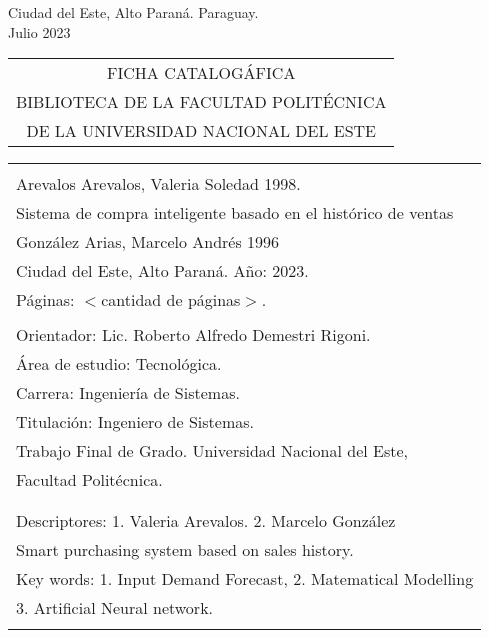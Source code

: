 \begin{center}
{\large Ciudad del Este, Alto Paraná. Paraguay.\\[6mm]
Julio 2023}
\end{center}
\newpage \normalsize
\thispagestyle{empty}
\begin{center} 
\begin{tabular}{c} 
  FICHA CATALOGÁFICA \\
  BIBLIOTECA DE LA FACULTAD POLITÉCNICA \\
  DE LA UNIVERSIDAD NACIONAL DEL ESTE \\
\end{tabular} %
\vspace{0.3cm}
\begin{tabular}{|l|} \hline %
  \\
  Arevalos Arevalos, Valeria Soledad 1998.\\
   Sistema de compra inteligente basado en el histórico de ventas  \\
  González Arias, Marcelo Andrés 1996\\
  Ciudad del Este, Alto Paraná. Año: 2023.\\
  Páginas: $<$cantidad de páginas$>$.\\ 
  \\
  Orientador: Lic. Roberto Alfredo Demestri Rigoni. \\
  
  Área de estudio: Tecnológica. \\
  Carrera: Ingeniería de Sistemas. \\
  Titulación: Ingeniero de Sistemas. \\
  
  Trabajo Final de Grado. Universidad Nacional del Este, \\
  Facultad Politécnica.\\
  \\ \\
  
  Descriptores: 1. Valeria Arevalos. 2. Marcelo González\\
  Smart purchasing system based on sales history. \\
  Key words: 1. Input Demand Forecast, 2. Matematical Modelling \\
  \hspace{2cm} 3. Artificial Neural network.\\
  \\
  \hline
  
\end{tabular}
\end{center}

